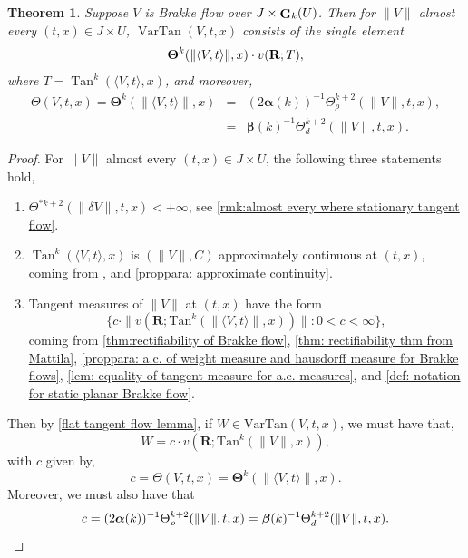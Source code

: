 \documentclass{article}
\theoremstyle{plain}
\newtheorem{theorem}{Theorem}[section]
\theoremstyle{definition}
\theoremstyle{plain}
\theoremstyle{remark}
\theoremstyle{remark}
\theoremstyle{plain}
\DeclareMathOperator{\Tan}{Tan}
\DeclareMathOperator{\G}{{\bf G}}
\DeclareMathOperator*{\Density}{\boldsymbol{\rm \Theta}}
\DeclareMathOperator{\VarTan}{VarTan}
\begin{document}
\begin{theorem}\label{thm: existence of unique static tangent flow}
    Suppose $V$ is Brakke flow over $J \times \G_k(U)$. Then 
    for $\|V\|$ almost every $(t,x)\in J\times U$,
    $\VarTan(V,t,x)$ consists of the single element
        \begin{equation}
            \label{eq:tangent flow eq}
                \textstyle \Density^{k}(\| \langle V, t \rangle \|, x)\cdot v(\mathbf R;T),
        \end{equation} 
        where $T = \Tan^k(\langle V,t\rangle,x)$, and moreover, 
        \begin{eqnarray*}
            \Theta (V, t, x) = \mathbf{\Theta}^{k} (\| \langle V, t \rangle \|, x) &=& (2 \boldsymbol{\alpha} (k))^{-1} \Theta^{k + 2}_{\rho} (\| V \|, t, x), \\ 
            &=& \boldsymbol{\beta} (k)^{-1} \Theta^{k + 2}_{d} (\| V \|, t, x).
        \end{eqnarray*}
\end{theorem}

\begin{proof}
    For $\|V\|$ almost every $(t, x) \in J \times U$, the following three statements hold,
    \begin{enumerate}
        \item $\Theta^{* k+2} (\| \delta V \|, t, x) < + \infty$, see \ref{rmk:almost every where stationary tangent flow}.
        \item $\Tan^k(\langle V,t\rangle,x)$ is $(\| V \|, C)$ approximately continuous at $(t, x)$, coming from \cite[Theorem C]{LW-Space-Time-GrassmannMeasureBrakkeFlow}, and \ref{proppara: approximate continuity}.
        \item Tangent measures of $\|V\|$ at $(t, x)$ have the form
    \[ \{ c \cdot \| v (\mathbf{R}; \mathrm{Tan}^{k} (\| \langle V, t \rangle\|, x))\| : 0<c< \infty\},\]
    coming from \ref{thm:rectifiability of Brakke flow}, \ref{thm: rectifiability thm from Mattila}, \ref{proppara: a.c. of weight measure and hausdorff measure for Brakke flows}, \ref{lem: equality of tangent measure for a.c. measures}, and \ref{def: notation for static planar Brakke flow}.
    \end{enumerate}
    Then by \ref{flat tangent flow lemma}, if $W \in \mathrm{VarTan} (V, t, x)$, we must have that, 
    \begin{equation*}
        W = c \cdot v (\mathbf{R}; \mathrm{Tan}^{k} (\| V \|, x)),
    \end{equation*}
    with $c$ given by, 
    \begin{equation*}
        c = \Theta (V, t, x) = \mathbf{\Theta}^{k} (\| \langle V, t \rangle \|, x).
    \end{equation*}
    Moreover, we must also have that
    \begin{equation*}
        c = (2 \boldsymbol{\alpha} (k))^{-1} \Theta_{\rho}^{k + 2} ( \| V \|, t, x) = \boldsymbol{\beta} (k)^{-1} \Theta_{d}^{k + 2} (\| V \|, t, x). \qedhere
    \end{equation*}
\end{proof}
\end{document}
